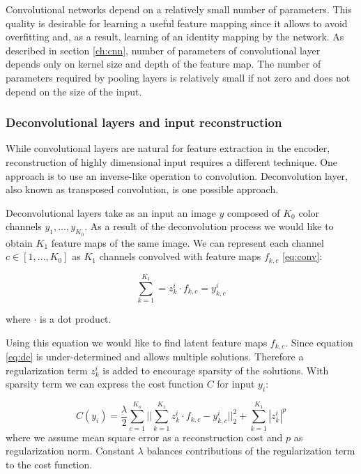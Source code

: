 Convolutional networks depend on a relatively small number of parameters.
This quality is desirable for learning a useful feature mapping since it allows to avoid overfitting and, as a result, learning of an identity mapping by the network.
As described in section \ref{ch:cnn}, number of parameters of convolutional layer depends only on kernel size and depth of the feature map.
The number of parameters required by pooling layers is relatively small if not zero and does not depend on the size of the input.

\subsubsection{Deconvolutional layers and input reconstruction}

While convolutional layers are natural for feature extraction in the encoder, reconstruction of highly dimensional input requires a different technique.
One approach is to use an inverse-like operation to convolution.
Deconvolution layer, also known as transposed convolution, is one possible approach.

Deconvolutional layers \cite{Zeiler2010} take as an input an image $y$ composed of $K_0$ color channels $y_1, ... , y_{K_0}$.
As a result of the deconvolution process we would like to obtain $K_1$ feature maps of the same image.
We can represent each channel $c \in [1, \ldots, K_0]$ as $K_1$ channels convolved with feature maps $f_{k,c}$ \ref{eq:conv}:

\begin{equation}\label{eq:de}
  \sum^{K_1}_{k=1}=z^i_k \cdot f_{k,c} = y^i_{k,c}
\end{equation}

where $\cdot$ is a dot product.

Using this equation we would like to find latent feature maps $f_{k,c}$.
Since equation \ref{eq:de} is under-determined and allows multiple solutions.
Therefore a regularization term $z^i_k$ is added to encourage sparsity of the solutions.
With sparsity term we can express the cost function $C$ for input $y_i$:

\begin{equation}\label{eq:dec}
    C(y_i) = \frac{\lambda}{2} \sum^{K_o}_{c=1} ||\sum^{K_1}_{k=1}{z^i_k \cdot f_{k,c} - y^i_{k,c}}||^2_2 + \sum^{K_1}_{k=1}{|z^i_k|^p}
\end{equation}
where we assume mean square error as a reconstruction cost and $p$ as regularization norm.
Constant $\lambda$ balances contributions of the regularization term to the cost function.

